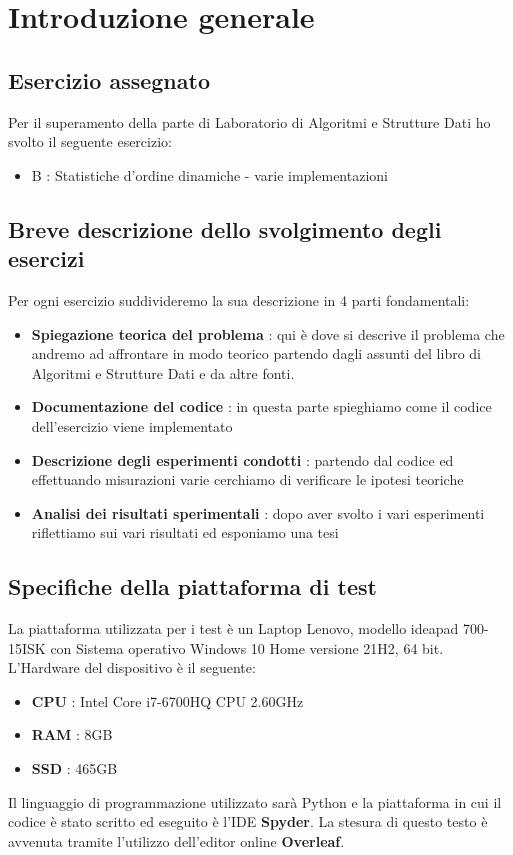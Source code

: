 \section{Introduzione generale}



\subsection{Esercizio assegnato}
Per il superamento della parte di Laboratorio di Algoritmi e Strutture Dati ho svolto il seguente esercizio:

\begin{itemize}
    \item B : Statistiche d'ordine dinamiche - varie implementazioni
\end{itemize}


\subsection{Breve descrizione dello svolgimento degli esercizi}
Per ogni esercizio suddivideremo la sua descrizione in 4 parti fondamentali:

\begin{itemize}
    \item \textbf{Spiegazione teorica del problema} : qui è dove si descrive il problema che andremo ad affrontare in modo teorico partendo dagli assunti del libro di Algoritmi e Strutture Dati e da altre fonti.
    \item \textbf{Documentazione del codice} : in questa parte spieghiamo come il codice dell'esercizio viene implementato 
    \item \textbf{Descrizione degli esperimenti condotti} : partendo dal codice ed effettuando misurazioni varie cerchiamo di verificare le ipotesi teoriche
    \item \textbf{Analisi dei risultati sperimentali} : dopo aver svolto i vari esperimenti riflettiamo sui vari risultati ed esponiamo una tesi
\end{itemize}

\subsection{Specifiche della piattaforma di test}
La piattaforma utilizzata per i test è un Laptop Lenovo, modello ideapad 700-15ISK con Sistema operativo Windows 10 Home versione 21H2, 64 bit. L'Hardware del dispositivo è il seguente:

\begin{itemize}
    \item \textbf{CPU} : Intel Core i7-6700HQ CPU 2.60GHz   
    \item \textbf{RAM} : 8GB
    \item \textbf{SSD} : 465GB 
\end{itemize}

Il linguaggio di programmazione utilizzato sarà Python e la piattaforma in cui il codice è stato scritto ed eseguito è l'IDE \textbf{Spyder}. 
La stesura di questo testo è avvenuta tramite l'utilizzo dell'editor online \textbf{Overleaf}.
